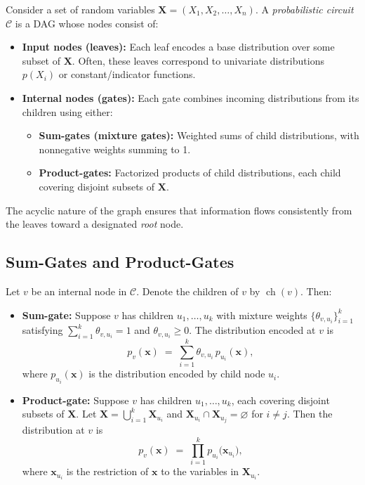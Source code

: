 Consider a set of random variables \(\mathbf{X} = (X_1, X_2, \dots, X_n)\). A \emph{probabilistic circuit} \(\mathcal{C}\) is a DAG whose nodes consist of:

\begin{itemize}
 \item \textbf{Input nodes (leaves):} Each leaf encodes a base distribution over some subset of \(\mathbf{X}\). Often, these leaves correspond to univariate distributions \(p(X_i)\) or constant/indicator functions.
 \item \textbf{Internal nodes (gates):} Each gate combines incoming distributions from its children using either:
   \begin{itemize}
   \item \textbf{Sum-gates (mixture gates):} Weighted sums of child distributions, with nonnegative weights summing to 1.
   \item \textbf{Product-gates:} Factorized products of child distributions, each child covering disjoint subsets of \(\mathbf{X}\).
   \end{itemize}
\end{itemize}
The acyclic nature of the graph ensures that information flows consistently from the leaves toward a designated \emph{root} node.

\subsection{Sum-Gates and Product-Gates}

Let \(v\) be an internal node in \(\mathcal{C}\). Denote the children of \(v\) by \(\operatorname{ch}(v)\). Then:

\begin{itemize}
\item \textbf{Sum-gate:} Suppose \(v\) has children \(u_1,\dots,u_k\) with mixture weights \(\{\theta_{v,u_i}\}_{i=1}^k\) satisfying \(\sum_{i=1}^k \theta_{v,u_i} = 1\) and \(\theta_{v,u_i} \ge 0\). The distribution encoded at \(v\) is
\begin{equation}
\label{eq:sum_gate}
p_v(\mathbf{x}) \;=\; \sum_{i=1}^k \theta_{v,u_i}\,p_{u_i}(\mathbf{x}),
\end{equation}
where \(p_{u_i}(\mathbf{x})\) is the distribution encoded by child node \(u_i\).

\item \textbf{Product-gate:} Suppose \(v\) has children \(u_1,\dots,u_k\), each covering disjoint subsets of \(\mathbf{X}\). Let \(\mathbf{X}=\bigcup_{i=1}^k \mathbf{X}_{u_i}\) and \(\mathbf{X}_{u_i}\cap \mathbf{X}_{u_j} = \varnothing\) for \(i\neq j\). Then the distribution at \(v\) is
\begin{equation}
\label{eq:product_gate}
p_v(\mathbf{x})
\;=\;
\prod_{i=1}^k
p_{u_i}\bigl(\mathbf{x}_{u_i}\bigr),
\end{equation}
where \(\mathbf{x}_{u_i}\) is the restriction of \(\mathbf{x}\) to the variables in \(\mathbf{X}_{u_i}\).
\end{itemize}

